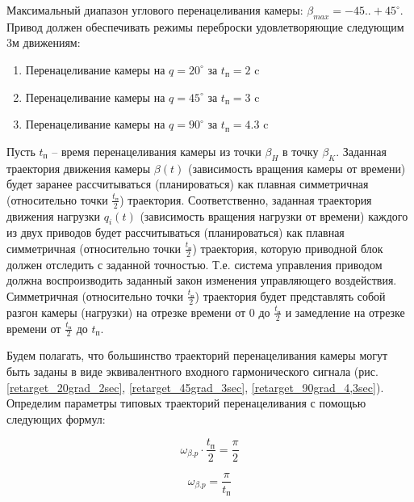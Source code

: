 Максимальный диапазон углового перенацеливания камеры: $\beta_{max} = -45..+45^{\circ}$.
Привод должен обеспечивать режимы переброски удовлетворяющие следующим 3м движениям:

\begin{enumerate}
    \item Перенацеливание камеры на $q = 20^{\circ}$ за $t_{\textit{п}} = 2  $ c
    \item Перенацеливание камеры на $q = 45^{\circ}$ за $t_{\textit{п}} = 3  $ c
    \item Перенацеливание камеры на $q = 90^{\circ}$ за $t_{\textit{п}} = 4.3$ c
\end{enumerate}

Пусть $t_\textit{п}$ – время перенацеливания камеры из точки $\beta_{H}$ в точку $\beta_{K}$.
Заданная траектория движения камеры $\beta(t)$ (зависимость вращения камеры от времени)
будет заранее рассчитываться (планироваться) как плавная симметричная
(относительно точки $\frac{t_\textit{п} }{2}$) траектория.
Соответственно, заданная траектория движения нагрузки $q_{i}(t)$
(зависимость вращения нагрузки от времени) каждого из двух приводов будет рассчитываться
(планироваться) как плавная симметричная (относительно точки $\frac{t_\textit{п} }{2}$)
траектория, которую приводной блок должен отследить с заданной точностью.
Т.е. система управления приводом должна воспроизводить заданный закон изменения управляющего
воздействия.
Симметричная (относительно точки $\frac{t_\textit{п} }{2}$) траектория будет представлять
собой разгон камеры (нагрузки) на отрезке времени от 0 до $\frac{t_\textit{п} }{2}$
и замедление на отрезке времени от $\frac{t_\textit{п} }{2}$ до $t_\textit{п}$.

Будем полагать, что большинство траекторий перенацеливания камеры могут быть заданы
в виде эквивалентного входного гармонического сигнала
(рис. \ref{retarget_20grad_2sec},
      \ref{retarget_45grad_3sec},
      \ref{retarget_90grad_4,3sec}).
Определим параметры типовых траекторий перенацеливания с помощью следующих формул:

\begin{equation}
    \label{retarget_angle}
    \omega_{\beta.p} \cdot \frac{t_\textit{п} }{2} = \frac{\pi}{2}
\end{equation}

\begin{equation}
    \label{equiv_signal_frequency}
    \omega_{\beta.p} = \frac{\pi}{t_\textit{п} }
\end{equation}

